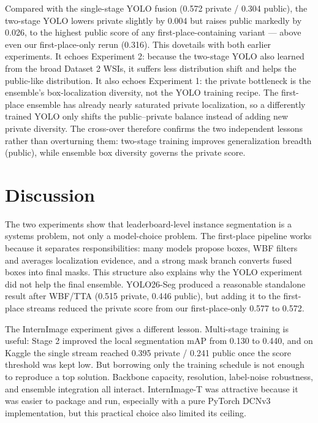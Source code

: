 \documentclass[12pt, a4paper]{article}
\begin{document}
Compared with the single-stage YOLO fusion (0.572 private / 0.304 public), the two-stage YOLO lowers private slightly by 0.004 but raises public markedly by 0.026, to the highest public score of any first-place-containing variant --- above even our first-place-only rerun (0.316). This dovetails with both earlier experiments. It echoes Experiment 2: because the two-stage YOLO also learned from the broad Dataset 2 WSIs, it suffers less distribution shift and helps the public-like distribution. It also echoes Experiment 1: the private bottleneck is the ensemble's box-localization diversity, not the YOLO training recipe. The first-place ensemble has already nearly saturated private localization, so a differently trained YOLO only shifts the public--private balance instead of adding new private diversity. The cross-over therefore confirms the two independent lessons rather than overturning them: two-stage training improves generalization breadth (public), while ensemble box diversity governs the private score.

\section{Discussion}
\label{sec:discussion}

The two experiments show that leaderboard-level instance segmentation is a systems problem, not only a model-choice problem. The first-place pipeline works because it separates responsibilities: many models propose boxes, WBF filters and averages localization evidence, and a strong mask branch converts fused boxes into final masks. This structure also explains why the YOLO experiment did not help the final ensemble. YOLO26-Seg produced a reasonable standalone result after WBF/TTA (0.515 private, 0.446 public), but adding it to the first-place streams reduced the private score from our first-place-only 0.577 to 0.572.

The InternImage experiment gives a different lesson. Multi-stage training is useful: Stage 2 improved the local segmentation mAP from 0.130 to 0.440, and on Kaggle the single stream reached 0.395 private / 0.241 public once the score threshold was kept low. But borrowing only the training schedule is not enough to reproduce a top solution. Backbone capacity, resolution, label-noise robustness, and ensemble integration all interact. InternImage-T was attractive because it was easier to package and run, especially with a pure PyTorch DCNv3 implementation, but this practical choice also limited its ceiling.
\end{document}
